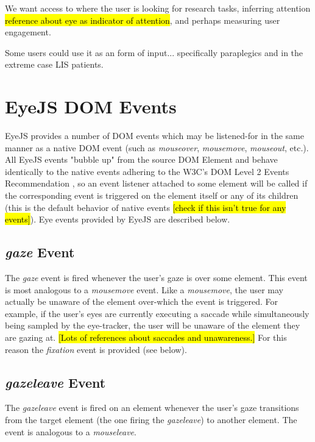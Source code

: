\documentclass{sigchi}
\begin{document}
We want access to where the user is looking for research tasks, inferring attention \hl{reference about eye as indicator of attention}, and perhaps measuring user engagement.

Some users could use it as an form of input... specifically paraplegics and in the extreme case LIS patients.



\section{EyeJS DOM Events}
EyeJS provides a number of DOM events which may be listened-for in the same manner as a native DOM event (such as \textit{mouseover}, \textit{mousemove}, \textit{mouseout}, etc.). All EyeJS events "bubble up" from the source DOM Element and behave identically to the native events adhering to the W3C's DOM Level 2 Events Recommendation \cite{domlevel1, domlevel2}, so an event listener attached to some element will be called if the corresponding event is triggered on the element itself or any of its children (this is the default behavior of native events \hl{[check if this isn't true for any events]}). Eye events provided by EyeJS are described below.

\subsection{\textbf{\textit{gaze}} Event}
The \textit{gaze} event is fired whenever the user's gaze is over some element. This event is most analogous to a \textit{mousemove} event. Like a \textit{mousemove}, the user may actually be unaware of the element over-which the event is triggered. For example, if the user's eyes are currently executing a saccade while simultaneously being sampled by the eye-tracker, the user will be unaware of the element they are gazing at. \hl{[Lots of references about saccades and unawareness.]} For this reason the \textit{fixation} event is provided (see below).

\subsection{\textbf{\textit{gazeleave}} Event}
The \textit{gazeleave} event is fired on an element whenever the user's gaze transitions from the target element (the one firing the \textit{gazeleave}) to another element. The event is analogous to a \textit{mouseleave}.
\end{document}
